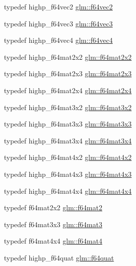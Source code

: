 \begin{DoxyCompactItemize}
\item 
typedef highp\+\_\+f64vec2 \hyperlink{group__gtc__type__precision_ga3f131d462df8154918f93ba1ac7cc4bd}{glm\+::f64vec2}
\item 
typedef highp\+\_\+f64vec3 \hyperlink{group__gtc__type__precision_ga794ee8f0a105cda01946cd9860f492a8}{glm\+::f64vec3}
\item 
typedef highp\+\_\+f64vec4 \hyperlink{group__gtc__type__precision_gac10d088c5f1d16a62fb019408af34e1b}{glm\+::f64vec4}
\item 
typedef highp\+\_\+f64mat2x2 \hyperlink{group__gtc__type__precision_gad125d405392e76f26f359798350fb64f}{glm\+::f64mat2x2}
\item 
typedef highp\+\_\+f64mat2x3 \hyperlink{group__gtc__type__precision_ga5b665390818b04bdd95bb6b2a25e5c2c}{glm\+::f64mat2x3}
\item 
typedef highp\+\_\+f64mat2x4 \hyperlink{group__gtc__type__precision_ga7f84d2c51081d56599a45c01d67ac155}{glm\+::f64mat2x4}
\item 
typedef highp\+\_\+f64mat3x2 \hyperlink{group__gtc__type__precision_gae6388c7664b5bb281047a9fd7984f97b}{glm\+::f64mat3x2}
\item 
typedef highp\+\_\+f64mat3x3 \hyperlink{group__gtc__type__precision_gad74db0197015b8d1d77ce54cf8d0ae60}{glm\+::f64mat3x3}
\item 
typedef highp\+\_\+f64mat3x4 \hyperlink{group__gtc__type__precision_gac9468e5fa519d06b452d3126bb22a597}{glm\+::f64mat3x4}
\item 
typedef highp\+\_\+f64mat4x2 \hyperlink{group__gtc__type__precision_gae716a8717cc6af191aec562d93ff6299}{glm\+::f64mat4x2}
\item 
typedef highp\+\_\+f64mat4x3 \hyperlink{group__gtc__type__precision_gaca283f88500d9895afb939516e7372d1}{glm\+::f64mat4x3}
\item 
typedef highp\+\_\+f64mat4x4 \hyperlink{group__gtc__type__precision_ga37a1ae1f6e67b5a6a06b1ee7c83f4bec}{glm\+::f64mat4x4}
\item 
typedef f64mat2x2 \hyperlink{group__gtc__type__precision_gaa66040c1fd82a9d1f6ac82d4e1e8baa6}{glm\+::f64mat2}
\item 
typedef f64mat3x3 \hyperlink{group__gtc__type__precision_gaa9e69ab90c0130b9a84a0a7fd8e49664}{glm\+::f64mat3}
\item 
typedef f64mat4x4 \hyperlink{group__gtc__type__precision_ga1e2d73ea989e6a5abd90cbe9f1025a41}{glm\+::f64mat4}
\item 
typedef highp\+\_\+f64quat \hyperlink{group__gtc__type__precision_ga860589eddc4ff95795a858318652b6ff}{glm\+::f64quat}
\end{DoxyCompactItemize}


